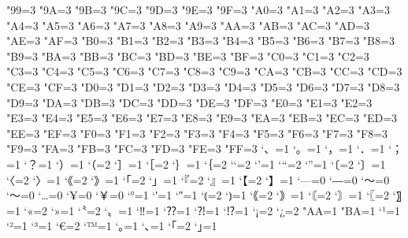 \xspcode"99=3
\xspcode"9A=3
\xspcode"9B=3
\xspcode"9C=3
\xspcode"9D=3
\xspcode"9E=3
\xspcode"9F=3
\xspcode"A0=3
\xspcode"A1=3
\xspcode"A2=3
\xspcode"A3=3
\xspcode"A4=3
\xspcode"A5=3
\xspcode"A6=3
\xspcode"A7=3
\xspcode"A8=3
\xspcode"A9=3
\xspcode"AA=3
\xspcode"AB=3
\xspcode"AC=3
\xspcode"AD=3
\xspcode"AE=3
\xspcode"AF=3
\xspcode"B0=3
\xspcode"B1=3
\xspcode"B2=3
\xspcode"B3=3
\xspcode"B4=3
\xspcode"B5=3
\xspcode"B6=3
\xspcode"B7=3
\xspcode"B8=3
\xspcode"B9=3
\xspcode"BA=3
\xspcode"BB=3
\xspcode"BC=3
\xspcode"BD=3
\xspcode"BE=3
\xspcode"BF=3
\xspcode"C0=3
\xspcode"C1=3
\xspcode"C2=3
\xspcode"C3=3
\xspcode"C4=3
\xspcode"C5=3
\xspcode"C6=3
\xspcode"C7=3
\xspcode"C8=3
\xspcode"C9=3
\xspcode"CA=3
\xspcode"CB=3
\xspcode"CC=3
\xspcode"CD=3
\xspcode"CE=3
\xspcode"CF=3
\xspcode"D0=3
\xspcode"D1=3
\xspcode"D2=3
\xspcode"D3=3
\xspcode"D4=3
\xspcode"D5=3
\xspcode"D6=3
\xspcode"D7=3
\xspcode"D8=3
\xspcode"D9=3
\xspcode"DA=3
\xspcode"DB=3
\xspcode"DC=3
\xspcode"DD=3
\xspcode"DE=3
\xspcode"DF=3
\xspcode"E0=3
\xspcode"E1=3
\xspcode"E2=3
\xspcode"E3=3
\xspcode"E4=3
\xspcode"E5=3
\xspcode"E6=3
\xspcode"E7=3
\xspcode"E8=3
\xspcode"E9=3
\xspcode"EA=3
\xspcode"EB=3
\xspcode"EC=3
\xspcode"ED=3
\xspcode"EE=3
\xspcode"EF=3
\xspcode"F0=3
\xspcode"F1=3
\xspcode"F2=3
\xspcode"F3=3
\xspcode"F4=3
\xspcode"F5=3
\xspcode"F6=3
\xspcode"F7=3
\xspcode"F8=3
\xspcode"F9=3
\xspcode"FA=3
\xspcode"FB=3
\xspcode"FC=3
\xspcode"FD=3
\xspcode"FE=3
\xspcode"FF=3
\inhibitxspcode`、=1
\inhibitxspcode`。=1
\inhibitxspcode`，=1
\inhibitxspcode`．=1
\inhibitxspcode`；=1
\inhibitxspcode`？=1
\inhibitxspcode`）=1
\inhibitxspcode`（=2
\inhibitxspcode`］=1
\inhibitxspcode`［=2
\inhibitxspcode`｝=1
\inhibitxspcode`｛=2
\inhibitxspcode`‘=2
\inhibitxspcode`’=1
\inhibitxspcode`“=2
\inhibitxspcode`”=1
\inhibitxspcode`〔=2
\inhibitxspcode`〕=1
\inhibitxspcode`〈=2
\inhibitxspcode`〉=1
\inhibitxspcode`《=2
\inhibitxspcode`》=1
\inhibitxspcode`「=2
\inhibitxspcode`」=1
\inhibitxspcode`『=2
\inhibitxspcode`』=1
\inhibitxspcode`【=2
\inhibitxspcode`】=1
\inhibitxspcode`—=0%
\inhibitxspcode`―=0%
\inhibitxspcode`〜=0%
\inhibitxspcode`～=0%
\inhibitxspcode`…=0
\inhibitxspcode`¥=0%
\inhibitxspcode`￥=0%
\inhibitxspcode`°=1
\inhibitxspcode`′=1
\inhibitxspcode`″=1
\inhibitxspcode`⦅=2
\inhibitxspcode`⦆=1
\inhibitxspcode`｟=2
\inhibitxspcode`｠=1
\inhibitxspcode`〘=2
\inhibitxspcode`〙=1
\inhibitxspcode`〖=2
\inhibitxspcode`〗=1
\inhibitxspcode`«=2
\inhibitxspcode`»=1
\inhibitxspcode`〝=2
\inhibitxspcode`〟=1
\inhibitxspcode`‼=1
\inhibitxspcode`⁇=1
\inhibitxspcode`⁈=1
\inhibitxspcode`⁉=1
\inhibitxspcode`¡=2
\inhibitxspcode`¿=2
\inhibitxspcode"AA=1%
\inhibitxspcode"BA=1%
\inhibitxspcode`¹=1
\inhibitxspcode`²=1
\inhibitxspcode`³=1
\inhibitxspcode`€=2
\inhibitxspcode`™=1
\inhibitxspcode`｡=1
\inhibitxspcode`､=1
\inhibitxspcode`｢=2
\inhibitxspcode`｣=1
